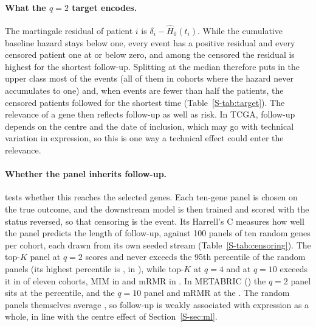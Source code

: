 \paragraph{What the $q = 2$ target encodes.} The martingale residual of patient $i$ is
$\delta_i - \hat H_0(t_i)$. While the cumulative baseline hazard stays below one, every
event has a positive residual and every censored patient one at or below zero, and among the
censored the residual is highest for the shortest follow-up. Splitting at the median
therefore puts in the upper class most of the events (all of them in cohorts where the
hazard never accumulates to one) and, when events are fewer than half the patients, the
censored patients followed for the shortest time (Table~\ref{S-tab:target}). The relevance of a gene then reflects follow-up as well as
risk. In TCGA, follow-up depends on the centre and the date of inclusion, which may go
with technical variation in expression, so this is one way a technical effect could
enter the relevance.

\paragraph{Whether the panel inherits follow-up.}  tests whether
this reaches the selected genes. Each ten-gene panel is chosen on the true outcome, and the
downstream model is then trained and scored with the status reversed, so that censoring is
the event. Its Harrell's C measures how well the panel predicts the length of follow-up,
against 100 panels of ten random genes per cohort, each drawn from its own seeded stream
(Table~\ref{S-tab:censoring}). The top-$K$ panel at $q = 2$ scores \SuppCensTopk{} and
never exceeds the 95th percentile of the random panels (its highest percentile is
\SuppCensTopkMaxPct, in \SuppCensTopkMaxCohort), while top-$K$ at $q = 4$ and at $q = 10$
exceeds it in \SuppCensAboveQfour{} of eleven cohorts, MIM in \SuppCensAboveMim{} and mRMR
in \SuppCensAboveMrmr. In METABRIC () the $q = 2$ panel sits at
the \SuppCensMetabricTopk{} percentile, and the $q = 10$ panel and mRMR at the
\SuppCensMetabricQten. The random panels themselves average \SuppCensRandomMean, so
follow-up is weakly associated with expression as a whole, in line with the centre effect
of Section~\ref{S-sec:ml}.

